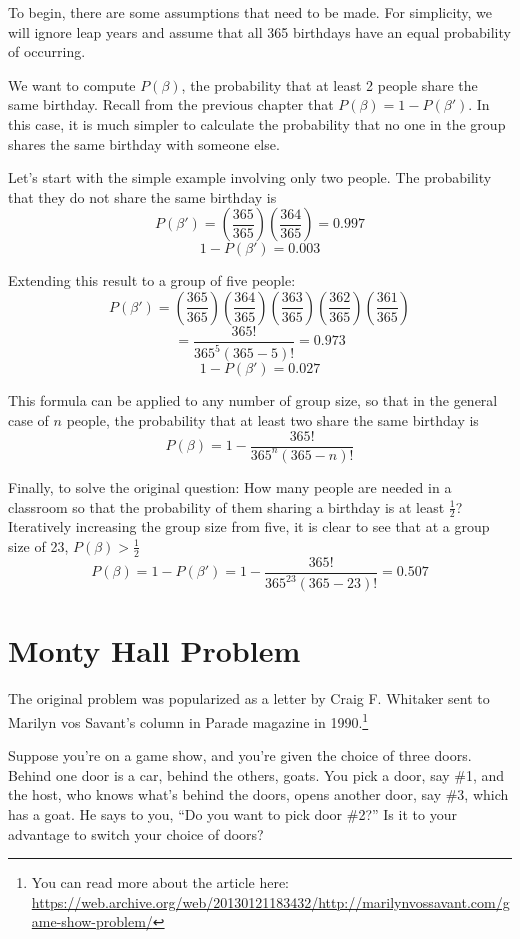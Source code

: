 \documentclass[
]{book}
\begin{document}
To begin, there are some assumptions that need to be made.
For simplicity, we will ignore leap years and assume that all 365 birthdays have an equal probability of occurring.

We want to compute \(P(\beta)\), the probability that at least 2 people share the same birthday.
Recall from the previous chapter that \(P(\beta) = 1 - P(\beta')\).
In this case, it is much simpler to calculate the probability that no one in the group shares the same birthday with someone else.

Let's start with the simple example involving only two people. The probability that they do not share the same birthday is
\[P(\beta') = \left( \frac{365}{365} \right) \left( \frac{364}{365} \right) = 0.997\]
\[1 - P(\beta') = 0.003\]

Extending this result to a group of five people:
\[P(\beta') = \left( \frac{365}{365} \right) \left( \frac{364}{365} \right) \left( \frac{363}{365} \right) 
\left( \frac{362}{365} \right) \left( \frac{361}{365} \right)\]
\[ = \frac{365!}{365^5(365 - 5)!} = 0.973\]
\[1 - P(\beta') = 0.027\]

This formula can be applied to any number of group size, so that in the general case of \(n\) people,
the probability that at least two share the same birthday is
\[P(\beta) = 1 - \frac{365!}{365^n(365 - n)!}\]

Finally, to solve the original question:
How many people are needed in a classroom so that the probability of them sharing a birthday is at least \(\frac{1}{2}\)?
Iteratively increasing the group size from five, it is clear to see that at a group size of 23, \(P(\beta) > \frac{1}{2}\)
\[P(\beta) = 1 - P(\beta') = 1 - \frac{365!}{365^{23}(365 - 23)!} = 0.507\]

\hypertarget{monty-hall-problem}{%
\section{Monty Hall Problem}\label{monty-hall-problem}}

The original problem was popularized as a letter by Craig F. Whitaker sent to Marilyn vos Savant's column in Parade magazine in 1990.\footnote{You can read more about the article here: \url{https://web.archive.org/web/20130121183432/http://marilynvossavant.com/game-show-problem/}}

Suppose you're on a game show, and you're given the choice of three doors. Behind one door is a car, behind the others, goats.
You pick a door, say \#1, and the host, who knows what's behind the doors, opens another door, say \#3, which has a goat.
He says to you, ``Do you want to pick door \#2?'' Is it to your advantage to switch your choice of doors?
\end{document}
